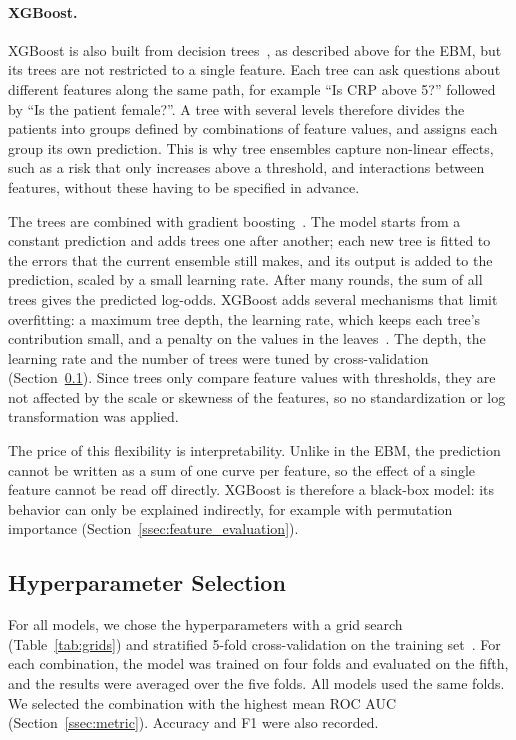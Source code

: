 \documentclass[conference]{IEEEtran}
\begin{document}
\paragraph{XGBoost.}
XGBoost is also built from decision trees~\cite{breiman1984cart}, as described
above for the EBM, but its trees are not restricted to a single feature. Each
tree can ask questions about different features along the same path, for
example ``Is CRP above 5?'' followed by ``Is the patient female?''. A tree with
several levels therefore divides the patients into groups defined by
combinations of feature values, and assigns each group its own prediction.
This is why tree ensembles capture non-linear effects, such as a risk that
only increases above a threshold, and interactions between features, without
these having to be specified in advance.

The trees are combined with gradient boosting~\cite{friedman2001greedy}. The
model starts from a constant prediction and adds trees one after another; each
new tree is fitted to the errors that the current ensemble still makes, and
its output is added to the prediction, scaled by a small learning rate. After
many rounds, the sum of all trees gives the predicted log-odds. XGBoost adds
several mechanisms that limit overfitting: a maximum tree depth, the learning
rate, which keeps each tree's contribution small, and a penalty on the values
in the leaves~\cite{chen2016xgboost}. The depth, the learning rate and the
number of trees were tuned by cross-validation (Section~\ref{ssec:tuning}).
Since trees only compare feature values with thresholds, they are not affected
by the scale or skewness of the features, so no standardization or log
transformation was applied.

The price of this flexibility is interpretability. Unlike in the EBM, the prediction
cannot be written as a sum of one curve per feature, so the effect of a single
feature cannot be read off directly. XGBoost is therefore a black-box model:
its behavior can only be explained indirectly, for example with permutation
importance (Section~\ref{ssec:feature_evaluation}).

\subsection{Hyperparameter Selection}
\label{ssec:tuning}

For all models, we chose the hyperparameters with a grid search
(Table~\ref{tab:grids}) and stratified 5-fold cross-validation on the training
set~\cite{kohavi1995cv}. For each combination, the model was trained on four
folds and evaluated on the fifth, and the results were averaged over the five
folds. All models used the same folds. We selected the combination with the
highest mean ROC AUC (Section~\ref{ssec:metric}). Accuracy and F1 were also
recorded.
\end{document}
